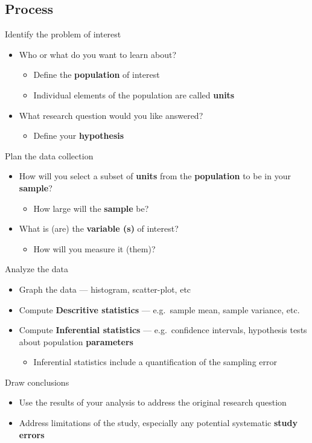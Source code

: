     \subsection{Process}
      Identify the problem of interest
      \begin{itemize}
        \item Who or what do you want to learn about?
        \begin{itemize}
          \item Define the \textbf{population} of interest
          \item Individual elements of the population are called \textbf{units}
        \end{itemize}
        \item What research question would you like answered?
        \begin{itemize}
          \item Define your \textbf{hypothesis}
        \end{itemize}
      \end{itemize}
      Plan the data collection
      \begin{itemize}
        \item How will you select a subset of \textbf{units} from the
        \textbf{population} to be in your \textbf{sample}?
        \begin{itemize}
          \item How large will the \textbf{sample} be?
        \end{itemize}
        \item What is (are) the \textbf{variable (s)} of interest?
        \begin{itemize}
          \item How will you measure it (them)?
        \end{itemize}
      \end{itemize}
      Analyze the data
      \begin{itemize}
        \item Graph the data --- histogram, scatter-plot, etc
        \item Compute \textbf{Descritive statistics} --- e.g.\ sample mean,
          sample variance, etc.
        \item Compute \textbf{Inferential statistics} --- e.g.\ confidence
        intervals, hypothesis tests about population \textbf{parameters}
          \begin{itemize}
            \item Inferential statistics include a quantification of the
            sampling error
          \end{itemize}
      \end{itemize}
      Draw conclusions
      \begin{itemize}
        \item Use the results of your analysis to address the original research
        question
        \item Address limitations of the study, especially any potential
        systematic \textbf{study errors}
      \end{itemize}


